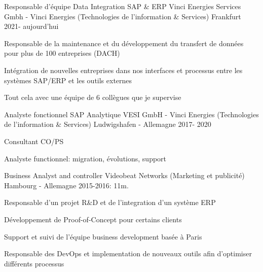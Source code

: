 

\begin{cventries}
  \cventry
    {Responsable d'équipe Data Integration SAP \& ERP} %
    {Vinci Energies Services Gmbh - Vinci Energies (Technologies de l'information \& Services)} %
    {Frankfurt} %
    {2021- aujourd'hui} %
    {
      \begin{cvitems} %
        \item {Responsable de la maintenance et du développement du transfert de données pour plus de 100 entreprises (DACH)}
        \item {Intégration de nouvelles entreprises dans nos interfaces et processus entre les systèmes SAP/ERP et les outils externes}
        \item {Tout cela avec une équipe de 6 collègues que je supervise}
      \end{cvitems}
    }
  \cventry
    {Analyste fonctionnel SAP Analytique} %
    {VESI GmbH - Vinci Energies (Technologies de l'information \& Services)} %
    {Ludwigshafen - Allemagne} %
    {2017- 2020} %
    {
      \begin{cvitems} %
        \item {Consultant CO/PS}
        \item {Analyste functionnel: migration, évolutions, support}
      \end{cvitems}
    }
  \cventry
    {Business Analyst and controller} %
    {Videobeat Networks (Marketing et publicité)} %
    {Hambourg - Allemagne} %
    {2015-2016: 11m.} %
    {
      \begin{cvitems} %
        \item {Responsable d'un projet R\&D et de l'integration d'un système ERP}
        \item {Développement de Proof-of-Concept pour certains clients}
        \item {Support et suivi de l'équipe business development basée à Paris}
        \item {Responsable des DevOps et implementation de nouveaux outils afin d'optimiser différents processus}
      \end{cvitems}
    }


\end{cventries}
